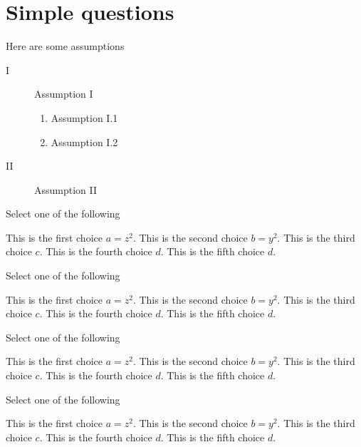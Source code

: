 \section{Simple questions}
\label{sec:quiz-ii::simple}

\begin{gram}[60]
Here are some assumptions
\begin{description}
\item[I] Assumption I
\begin{enumerate}
\item Assumption I.1
\item Assumption I.2
\end{enumerate}

\item[II] Assumption II
\end{description}
\end{gram}


\begin{problem}[70][Pickone I]
Select one of the following
\begin{pickone}
\choice This is the first choice $a = z^2$.
\choice This is the second choice $b = y^2$.
\correctchoice This is the third choice $c$.
\correctchoice This is the fourth choice $d$.
\choice This is the fifth choice $d$.
\end{pickone}
\end{problem}

\begin{problem}[80][Pickone I.2]
Select one of the following
\begin{pickany}
\choice This is the first choice $a = z^2$.
\choice This is the second choice $b = y^2$.
\correctchoice This is the third choice $c$.
\correctchoice This is the fourth choice $d$.
\choice This is the fifth choice $d$.
\end{pickany}
\end{problem}


\begin{problem}[90][Pickone II]
Select one of the following
\begin{pickone}
\choice This is the first choice $a = z^2$.
\choice This is the second choice $b = y^2$.
\correctchoice This is the third choice $c$.
\correctchoice This is the fourth choice $d$.
\choice This is the fifth choice $d$.
\end{pickone}
\end{problem}

\begin{problem}
Select one of the following
\begin{pickone}
\choice This is the first choice $a = z^2$.
\choice This is the second choice $b = y^2$.
\correctchoice This is the third choice $c$.
\correctchoice This is the fourth choice $d$.
\choice This is the fifth choice $d$.
\end{pickone}
\end{problem}


